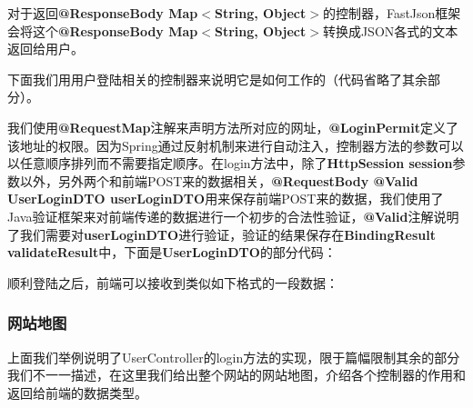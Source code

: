 对于返回\textbf{@ResponseBody Map$<$String, Object$>$}的控制器，FastJson框架会将这个\textbf{@ResponseBody Map$<$String, Object$>$}转换成JSON各式的文本返回给用户。

下面我们用用户登陆相关的控制器来说明它是如何工作的（代码省略了其余部分）。



我们使用\textbf{@RequestMap}注解来声明方法所对应的网址，\textbf{@LoginPermit}定义了该地址的权限。因为Spring通过反射机制来进行自动注入，控制器方法的参数可以以任意顺序排列而不需要指定顺序。在login方法中，除了\textbf{HttpSession session}参数以外，另外两个和前端POST来的数据相关，\textbf{@RequestBody @Valid UserLoginDTO userLoginDTO}用来保存前端POST来的数据，我们使用了Java验证框架来对前端传递的数据进行一个初步的合法性验证，\textbf{@Valid}注解说明了我们需要对\textbf{userLoginDTO}进行验证，验证的结果保存在\textbf{BindingResult validateResult}中，下面是\textbf{UserLoginDTO}的部分代码：



顺利登陆之后，前端可以接收到类似如下格式的一段数据：



\subsubsection{网站地图}
上面我们举例说明了UserController的login方法的实现，限于篇幅限制其余的部分我们不一一描述，在这里我们给出整个网站的网站地图，介绍各个控制器的作用和返回给前端的数据类型。

